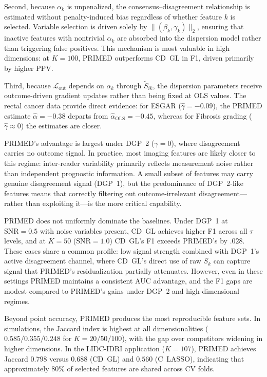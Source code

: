 \documentclass[referee,lineno,pdflatex,sn-vancouver-num]{sn-jnl}
\begin{document}
Second, because $\alpha_k$ is unpenalized, the consensus--disagreement relationship is estimated without penalty-induced bias regardless of whether feature $k$ is selected.
Variable selection is driven solely by $\|(\beta_k, \gamma_k)\|_2$, ensuring that inactive features with nontrivial $\alpha_k$ are absorbed into the dispersion model rather than triggering false positives.
This mechanism is most valuable in high dimensions: at $K = 100$, PRIMED outperforms CD~GL in F1, driven primarily by higher PPV.

Third, because $\mathcal{L}_{\mathrm{out}}$ depends on $\alpha_k$ through $\tilde S_{ik}$, the dispersion parameters receive outcome-driven gradient updates rather than being fixed at OLS values.
The rectal cancer data provide direct evidence: for ESGAR ($\hat\gamma = -0.09$), the PRIMED estimate $\hat\alpha = -0.38$ departs from $\hat\alpha_{\mathrm{OLS}} = -0.45$, whereas for Fibrosis grading ($\hat\gamma \approx 0$) the estimates are closer.

PRIMED's advantage is largest under DGP~2 ($\gamma = 0$), where disagreement carries no outcome signal.
In practice, most imaging features are likely closer to this regime: inter-reader variability primarily reflects measurement noise rather than independent prognostic information.
A small subset of features may carry genuine disagreement signal (DGP~1), but the predominance of DGP~2-like features means that correctly filtering out outcome-irrelevant disagreement---rather than exploiting it---is the more critical capability.

PRIMED does not uniformly dominate the baselines.
Under DGP~1 at $\mathrm{SNR} = 0.5$ with noise variables present, CD~GL achieves higher F1 across all $\tau$ levels, and at $K = 50$ ($\mathrm{SNR} = 1.0$) CD~GL's F1 exceeds PRIMED's by $.028$.
These cases share a common profile: low signal strength combined with DGP~1's active disagreement channel, where CD~GL's direct use of raw $S_k$ can capture signal that PRIMED's residualization partially attenuates.
However, even in these settings PRIMED maintains a consistent AUC advantage, and the F1 gaps are modest compared to PRIMED's gains under DGP~2 and high-dimensional regimes.

Beyond point accuracy, PRIMED produces the most reproducible feature sets.
In simulations, the Jaccard index is highest at all dimensionalities ($0.585/0.355/0.248$ for $K = 20/50/100$), with the gap over competitors widening in higher dimensions.
In the LIDC-IDRI application ($K = 107$), PRIMED achieves Jaccard $0.798$ versus $0.688$ (CD~GL) and $0.560$ (C~LASSO), indicating that approximately 80\% of selected features are shared across CV folds.
\end{document}
